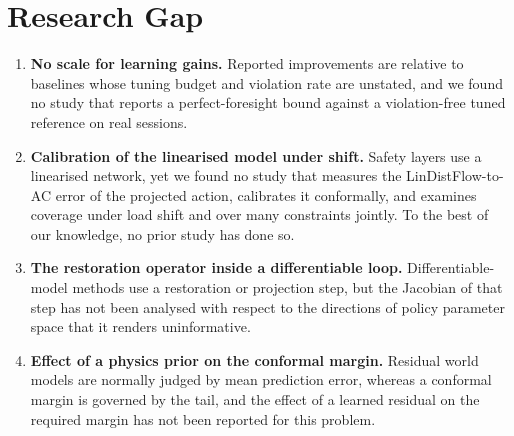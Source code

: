 \documentclass[11pt]{article}
\begin{document}
\section{Research Gap}\label{sec:gap}
\begin{enumerate}
\item \textbf{No scale for learning gains.} Reported improvements are relative to baselines whose tuning budget and violation rate are unstated, and we found no study that reports a perfect-foresight bound against a violation-free tuned reference on real sessions.
\item \textbf{Calibration of the linearised model under shift.} Safety layers use a linearised network, yet we found no study that measures the LinDistFlow-to-AC error of the projected action, calibrates it conformally, and examines coverage under load shift and over many constraints jointly. To the best of our knowledge, no prior study has done so.
\item \textbf{The restoration operator inside a differentiable loop.} Differentiable-model methods use a restoration or projection step, but the Jacobian of that step has not been analysed with respect to the directions of policy parameter space that it renders uninformative.
\item \textbf{Effect of a physics prior on the conformal margin.} Residual world models are normally judged by mean prediction error, whereas a conformal margin is governed by the tail, and the effect of a learned residual on the required margin has not been reported for this problem.
\end{enumerate}

\end{document}
